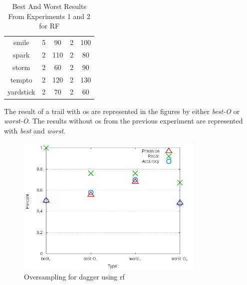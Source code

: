 \begin{table}[ht]
\begin{center}
\begin{tabular}{|c|c|c|c|c|}
        smile & 5 & 90 & 2 & 100 \\
        spark & 2 & 110 & 2 & 80 \\
        storm & 2 & 60 & 2 & 90 \\
        tempto & 2 & 120 & 2 & 130 \\
        yardstick & 2 & 70 & 2 & 60 \\
        \hline
    \end{tabular}
    \caption{Best And Worst Results From Experiments 1 and 2 for RF}
    \label{tab:rf_best_worst_swr_experiment_sets}
\end{center}
\end{table}

The result of a trail with \gls{os} are represented in the figures by either \textit{best-O} or \textit{worst-O}. The results without \gls{os} from the previous experiment are represented with \textit{best} and \textit{worst}.


\begin{figure}[!ht]
    \centering
        \includegraphics[width=0.8\textwidth]{images/rf/test_4/dagger_sample_range}
        \caption{Oversampling for dagger using \gls{rf}}
        \label{fig:test_4_dagger_rf}
\end{figure}

